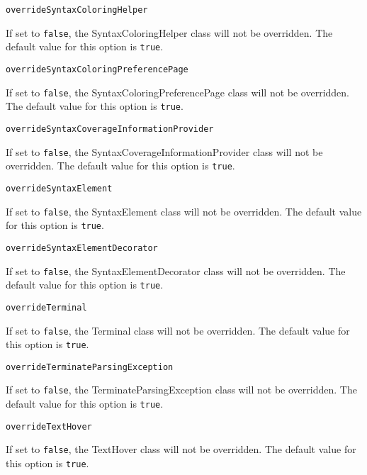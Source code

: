 \noindent\texttt{overrideSyntaxColoringHelper}
\begin{myindentpar}{1cm}
If set to \texttt{false}, the SyntaxColoringHelper class will not be overridden. The default value for this option is \texttt{true}.
\end{myindentpar}

\noindent\texttt{overrideSyntaxColoringPreferencePage}
\begin{myindentpar}{1cm}
If set to \texttt{false}, the SyntaxColoringPreferencePage class will not be overridden. The default value for this option is \texttt{true}.
\end{myindentpar}

\noindent\texttt{overrideSyntaxCoverageInformationProvider}
\begin{myindentpar}{1cm}
If set to \texttt{false}, the SyntaxCoverageInformationProvider class will not be overridden. The default value for this option is \texttt{true}.
\end{myindentpar}

\noindent\texttt{overrideSyntaxElement}
\begin{myindentpar}{1cm}
If set to \texttt{false}, the SyntaxElement class will not be overridden. The default value for this option is \texttt{true}.
\end{myindentpar}

\noindent\texttt{overrideSyntaxElementDecorator}
\begin{myindentpar}{1cm}
If set to \texttt{false}, the SyntaxElementDecorator class will not be overridden. The default value for this option is \texttt{true}.
\end{myindentpar}

\noindent\texttt{overrideTerminal}
\begin{myindentpar}{1cm}
If set to \texttt{false}, the Terminal class will not be overridden. The default value for this option is \texttt{true}.
\end{myindentpar}

\noindent\texttt{overrideTerminateParsingException}
\begin{myindentpar}{1cm}
If set to \texttt{false}, the TerminateParsingException class will not be overridden. The default value for this option is \texttt{true}.
\end{myindentpar}

\noindent\texttt{overrideTextHover}
\begin{myindentpar}{1cm}
If set to \texttt{false}, the TextHover class will not be overridden. The default value for this option is \texttt{true}.
\end{myindentpar}

